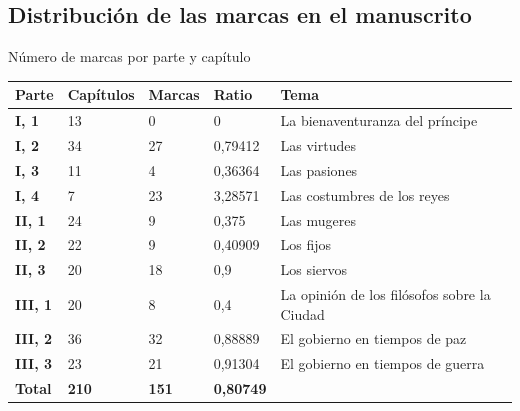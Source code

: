\documentclass[11pt,aspectratio=169]{beamer}
\begin{document}
\subsection{Distribución de las marcas en el manuscrito}
\begin{frame}{Número de marcas por parte y capítulo}
\begin{table}[!ht]
    \centering
    \begin{tabular}{|l|l|l|l|l|}
    \hline
        \textbf{Parte} & \textbf{Capítulos} & \textbf{Marcas} & \textbf{Ratio} & \textbf{Tema} \\ \hline
        \textbf{I, 1} & 13 & 0 & 0 & La bienaventuranza del príncipe \\ \hline
        \textbf{I, 2} & 34 & 27 & 0,79412 & Las virtudes \\ \hline
        \textbf{I, 3} & 11 & 4 & 0,36364 & Las pasiones \\ \hline
        \textbf{I, 4} & 7 & 23 & 3,28571 & Las costumbres de los reyes \\ \hline
        \textbf{II, 1} & 24 & 9 & 0,375 & Las mugeres \\ \hline
        \textbf{II, 2} & 22 & 9 & 0,40909 & Los fijos \\ \hline
        \textbf{II, 3} & 20 & 18 & 0,9 & Los siervos \\ \hline
        \textbf{III, 1} & 20 & 8 & 0,4 & La opinión de los filósofos sobre la Ciudad \\ \hline
        \textbf{III, 2} & 36 & 32 & 0,88889 & El gobierno en tiempos de paz \\ \hline
        \textbf{III, 3} & 23 & 21 & 0,91304 & El gobierno en tiempos de guerra \\ \hline
        \textbf{Total} & \textbf{210} & \textbf{151} & \textbf{0,80749} & ~ \\ \hline
    \end{tabular}
\end{table}
\end{frame}
\end{document}
